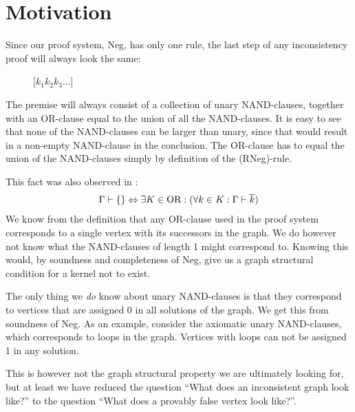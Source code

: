 \section{Motivation}
\label{sec:Motivation}
Since our proof system, Neg, has only one rule, the last step of any inconsistency proof will always look the same:\par
\begin{figure}[!h]
  \centering
  \begin{prooftree*}
    \Hypo{\dots}
    [$k_1k_2k_3\dots$]{\varnothing}
  \end{prooftree*}
  \caption{}
  \label{fig:proof_unary_nand}
\end{figure}
The premise will always consist of a collection of unary NAND-clauses, together with an OR-clause equal to the union of all the NAND-clauses.
It is easy to see that none of the NAND-clauses can be larger than unary, since that would result in a non-empty NAND-clause in the conclusion.
The OR-clause has to equal the union of the NAND-clauses simply by definition of the (RNeg)-rule.

This fact was also observed in \cite{michal-completeness}:
\begin{align}
  \Gamma \vdash \{\} \Leftrightarrow \exists K \in \text{OR}: (\forall  k \in K: \Gamma \vdash \ol{k})
\end{align}
We know from the definition that any OR-clause used in the proof system corresponds to a single vertex with its successors in the graph.
We do however not know what the NAND-clauses of length 1 might correspond to.
Knowing this would, by soundness and completeness of Neg, give us a graph structural condition for a kernel not to exist.

The only thing we \textit{do} know about unary NAND-clauses is that they correspond to vertices that are assigned 0 in all solutions of the graph.
We get this from soundness of Neg.
As an example, consider the axiomatic unary NAND-clauses, which corresponds to loops in the graph.
Vertices with loops can not be assigned 1 in any solution.

This is however not the graph structural property we are ultimately looking for, but at least we have reduced the question ``What does an inconsistent graph look like?'' to the question ``What does a provably false vertex look like?''.

